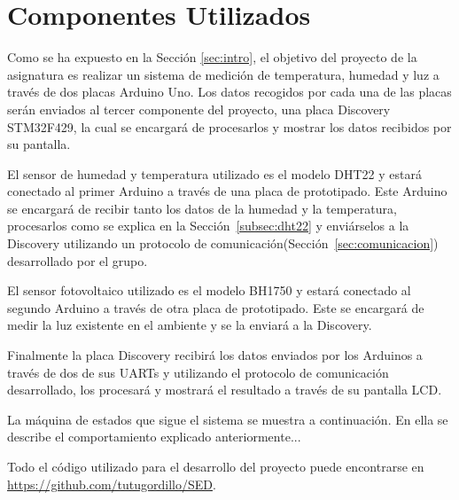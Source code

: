 \section{Componentes Utilizados}\label{sec:arquitectura}

Como se ha expuesto en la Secci\'on \ref{sec:intro}, el objetivo del
proyecto de la asignatura es realizar un sistema de medici\'on de
temperatura, humedad y luz a trav\'es de dos placas Arduino Uno. Los
datos recogidos por cada una de las placas ser\'an enviados al tercer
componente del proyecto, una placa Discovery STM32F429, la cual se
encargar\'a de procesarlos y mostrar los datos recibidos por su
pantalla.

El sensor de humedad y temperatura utilizado es el modelo DHT22 y
estar\'a conectado al primer Arduino a trav\'es de una placa de
prototipado. Este Arduino se encargar\'a de recibir tanto los datos de
la humedad y la temperatura, procesarlos como se explica en la
Secci\'on~\ref{subsec:dht22} y envi\'arselos a la Discovery utilizando
un protocolo de comunicaci\'on(Secci\'on~\ref{sec:comunicacion}) desarrollado por el grupo.

El sensor fotovoltaico utilizado es el modelo BH1750 y estar\'a
conectado al segundo Arduino a trav\'es de otra placa de
prototipado. Este se encargar\'a de medir la luz existente en el
ambiente y se la enviar\'a a la Discovery. %

Finalmente la placa Discovery recibir\'a los datos enviados por los
Arduinos a trav\'es de dos de sus UARTs y utilizando el protocolo de
comunicaci\'on desarrollado, los procesar\'a y mostrar\'a el resultado
a trav\'es de su pantalla LCD.


La m\'aquina de estados que sigue el sistema se muestra a
continuaci\'on. En ella se describe el comportamiento explicado
anteriormente...

Todo el c\'odigo utilizado para el desarrollo del proyecto puede
encontrarse en \url{https://github.com/tutugordillo/SED}.
